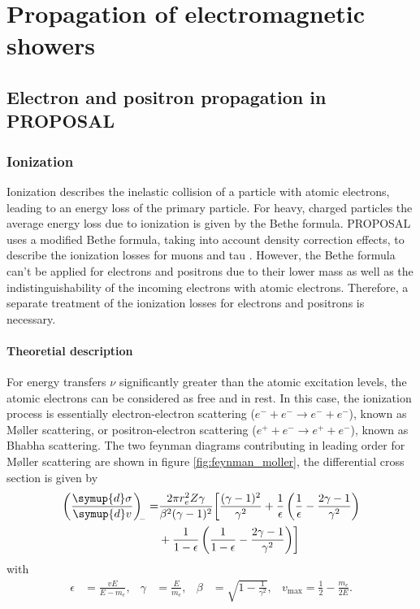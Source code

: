 \chapter{Propagation of electromagnetic showers}

\section{Electron and positron propagation in PROPOSAL}

\subsection{Ionization}

Ionization describes the inelastic collision of a particle with atomic electrons, leading to an energy loss of the primary particle.
For heavy, charged particles the average energy loss due to ionization is given by the Bethe formula.
PROPOSAL uses a modified Bethe formula, taking into account density correction effects, to describe the ionization losses for muons and tau \cite{Kohne:2013zbq}.
However, the Bethe formula can't be applied for electrons and positrons due to their lower mass as well as the indistinguishability of the incoming electrons with atomic electrons.
Therefore, a separate treatment of the ionization losses for electrons and positrons is necessary.

\subsubsection{Theoretial description}

For energy transfers $\nu$ significantly greater than the atomic excitation levels, the atomic electrons can be considered as free and in rest.
In this case, the ionization process is essentially electron-electron scattering ($e^- + e^- \rightarrow e^- + e^-$), known as M{\o}ller scattering, or positron-electron scattering ($e^+ + e^- \rightarrow e^+ + e^-$), known as Bhabha scattering.
The two feynman diagrams contributing in leading order for M{\o}ller scattering are shown in figure \ref{fig:feynman_moller}, the differential cross section \cite{PhysRev.93.38} is given by
%
\begin{equation}
	\begin{split}
	\label{eqn:moller}
	\left(\frac{\symup{d}\sigma}{\symup{d}v}\right)_{\!\!-} = &\frac{2 \pi r_e^2 Z \gamma}{\beta^2(\gamma - 1)^2} \biggl[ \frac{(\gamma - 1)^2}{\gamma^2} + \frac{1}{\epsilon} \left( \frac{1}{\epsilon} - \frac{2\gamma - 1}{\gamma^2} \right) \\ &+ \frac{1}{1 - \epsilon} \left( \frac{1}{1 - \epsilon} - \frac{2 \gamma - 1}{\gamma^2} \right) \biggr]
	\end{split}
\end{equation}
%
with
%
\begin{align}
	\epsilon &= \frac{v E}{E - m_e},& \gamma &= \frac{E}{m_e}, & \beta &= \sqrt{1 - \frac{1}{\gamma^2}}, & v_{\text{max}} = \frac{1}{2} - \frac{m_e}{2 E}.
\end{align}


